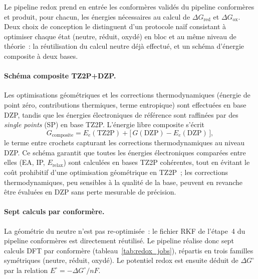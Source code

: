 Le pipeline redox prend en entrée les conformères validés du pipeline conformères et produit, pour chacun, les énergies nécessaires au calcul de $\Delta G_{\text{red}}$ et $\Delta G_{\text{ox}}$. Deux choix de conception le distinguent d'un protocole naïf consistant à optimiser chaque état (neutre, réduit, oxydé) en bloc et au même niveau de théorie~: la réutilisation du calcul neutre déjà effectué, et un schéma d'énergie composite à deux bases.

\paragraph{Schéma composite TZ2P+DZP.}
Les optimisations géométriques et les corrections thermodynamiques (énergie de point zéro, contributions thermiques, terme entropique) sont effectuées en base DZP, tandis que les énergies électroniques de référence sont raffinées par des \emph{single points} (SP) en base TZ2P. L'énergie libre composite s'écrit
\begin{equation}
G_{\text{composite}} = E_e(\text{TZ2P}) + \big[\,G(\text{DZP}) - E_e(\text{DZP})\,\big],
\label{eq:composite}
\end{equation}
le terme entre crochets capturant les corrections thermodynamiques au niveau DZP. Ce schéma garantit que toutes les énergies électroniques comparées entre elles (EA, IP, $E_{\text{relax}}$) sont calculées en bases TZ2P cohérentes, tout en évitant le coût prohibitif d'une optimisation géométrique en TZ2P~; les corrections thermodynamiques, peu sensibles à la qualité de la base, peuvent en revanche être évaluées en DZP sans perte mesurable de précision.

\paragraph{Sept calculs par conformère.}
La géométrie du neutre n'est pas re-optimisée~: le fichier RKF de l'étape~4 du pipeline conformères est directement réutilisé. Le pipeline réalise donc sept calculs DFT par conformère (tableau~\ref{tab:redox_jobs}), répartis en trois familles symétriques (neutre, réduit, oxydé). Le potentiel redox est ensuite déduit de $\Delta G^\circ$ par la relation $E^\circ = -\Delta G^\circ / nF$.

